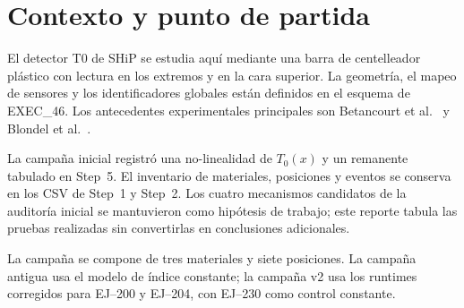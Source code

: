 \chapter{Contexto y punto de partida}
El detector T0 de SHiP se estudia aquí mediante una barra de centelleador plástico con lectura en los extremos y en la cara superior. La geometría, el mapeo de sensores y los identificadores globales están definidos en el esquema de EXEC\_46. Los antecedentes experimentales principales son Betancourt et al.~\cite{Betancourt2020} y Blondel et al.~\cite{Blondel2018}.

La campaña inicial registró una no-linealidad de $T_0(x)$ y un remanente tabulado en Step~5. El inventario de materiales, posiciones y eventos se conserva en los CSV de Step~1 y Step~2. Los cuatro mecanismos candidatos de la auditoría inicial se mantuvieron como hipótesis de trabajo; este reporte tabula las pruebas realizadas sin convertirlas en conclusiones adicionales.

La campaña se compone de tres materiales y siete posiciones. La campaña antigua usa el modelo de índice constante; la campaña v2 usa los runtimes corregidos para EJ--200 y EJ--204, con EJ--230 como control constante.
